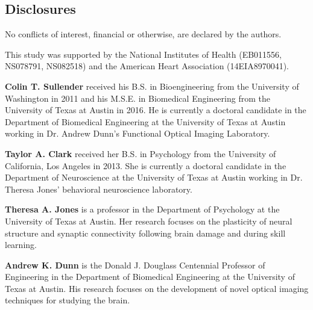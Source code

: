 \documentclass[12pt]{spieman}  %
\begin{document}
\begin{spacing}{2}
\subsection*{Disclosures}
No conflicts of interest, financial or otherwise, are declared by the authors.

\acknowledgments
This study was supported by the National Institutes of Health (EB011556, NS078791, NS082518) and the American Heart Association (14EIA8970041).





\vspace{1ex}
\vspace{2ex}\noindent\textbf{Colin T. Sullender} received his B.S. in Bioengineering from the University of Washington in 2011 and his M.S.E. in Biomedical Engineering from the University of Texas at Austin in 2016. He is currently a doctoral candidate in the Department of Biomedical Engineering at the University of Texas at Austin working in Dr. Andrew Dunn's Functional Optical Imaging Laboratory.

\vspace{2ex}\noindent\textbf{Taylor A. Clark} received her B.S. in Psychology from the University of California, Los Angeles in 2013. She is currently a doctoral candidate in the Department of Neuroscience at the University of Texas at Austin working in Dr. Theresa Jones' behavioral neuroscience laboratory.

\vspace{2ex}\noindent\textbf{Theresa A. Jones} is a professor in the Department of Psychology at the University of Texas at Austin. Her research focuses on the plasticity of neural structure and synaptic connectivity following brain damage and during skill learning.

\vspace{2ex}\noindent\textbf{Andrew K. Dunn} is the Donald J. Douglass Centennial Professor of Engineering in the Department of Biomedical Engineering at the University of Texas at Austin. His research focuses on the development of novel optical imaging techniques for studying the brain.


\end{spacing}
\end{document}
